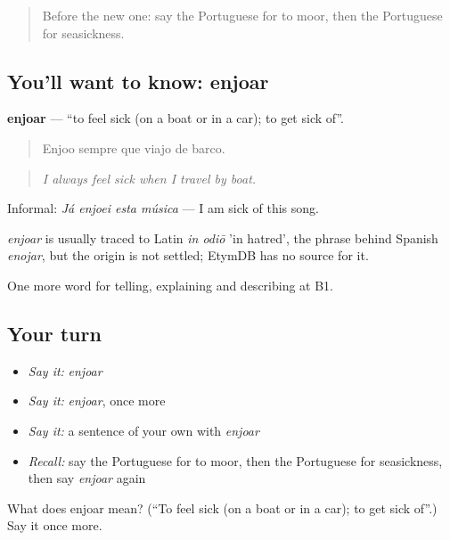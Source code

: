 \label{lesson:PT-C420-enjoar}



\begin{quote}
Before the new one: say the Portuguese for to moor, then the Portuguese for seasickness.
\end{quote}

\subsection*{You'll want to know: enjoar}
\textbf{enjoar} — \textquotedblleft{}to feel sick (on a boat or in a car); to get sick of\textquotedblright{}.

\begin{quote}
Enjoo sempre que viajo de barco.
\end{quote}

\begin{quote}
\emph{I always feel sick when I travel by boat.}
\end{quote}

Informal: \emph{Já enjoei esta música} — I am sick of this song.

\begin{cousinweb}
\emph{enjoar} is usually traced to Latin \emph{in odiō} 'in hatred', the phrase behind Spanish \emph{enojar}, but the origin is not settled; EtymDB has no source for it.
\end{cousinweb}

\begin{grammarlens}[title={What you've built}]
One more word for telling, explaining and describing at B1.
\end{grammarlens}

\subsection*{Your turn}
\begin{itemize}
\raggedright
  \item \emph{Say it:} \emph{enjoar}
  \item \emph{Say it:} \emph{enjoar}, once more
  \item \emph{Say it:} a sentence of your own with \emph{enjoar}
  \item \emph{Recall:} say the Portuguese for to moor, then the Portuguese for seasickness, then say \emph{enjoar} again
\end{itemize}

\begin{tcolorbox}[breakable,colback=teal!4,colframe=teal!35!black,title={Before you move on}]
What does enjoar mean? (\textquotedblleft{}To feel sick (on a boat or in a car); to get sick of\textquotedblright{}.) Say it once more.
\end{tcolorbox}
